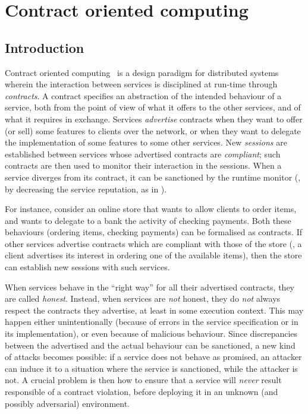 
\chapter{Contract oriented computing}\label{chap:co2}

\section{Introduction}
Contract oriented computing~\cite{BZ10lics} is a design paradigm for distributed systems wherein the interaction between services is disciplined at run-time through \emph{contracts}.
A contract specifies an abstraction of the intended behaviour of a service, both from the point of view of what it offers to the other services, and of what it requires in exchange.
Services \emph{advertise} contracts when they want to offer (or sell) some features to clients over the network, or when they want to delegate the implementation of some features to some other services.
%
New \emph{sessions} are established between services whose advertised contracts are \emph{compliant}; such contracts are then used to monitor their interaction in the sessions. When a service diverges from its contract, it can be sanctioned by the runtime monitor (\eg, by decreasing the service reputation, as in \cite{Mukhija2007qos}).

For instance, consider an online store that wants to allow clients to order items, and wants to delegate to a bank the activity of checking payments. Both these behaviours (ordering items, checking payments) can be formalised as contracts.
If other services advertise contracts which are compliant with those of the store (\eg, a client advertises its interest in ordering one of the available items), then the store can establish new sessions with such services.

When services behave in the ``right way'' for all their advertised contracts, they are called \emph{honest}. Instead, when services are \emph{not} honest, they do \emph{not} always respect the contracts they advertise, at least in some execution context.
This may happen either unintentionally (because of errors in the service specification or in its implementation), or even because of malicious behaviour.
Since discrepancies between the advertised and the actual behaviour can be sanctioned, a new kind of attacks becomes possible: if a service does not behave as promised, an attacker can induce it to a situation where the service is sanctioned, while the attacker is not.
A crucial problem is then how to ensure that a service will \emph{never} result responsible of a contract violation, before deploying it in an unknown (and possibly adversarial) environment.

